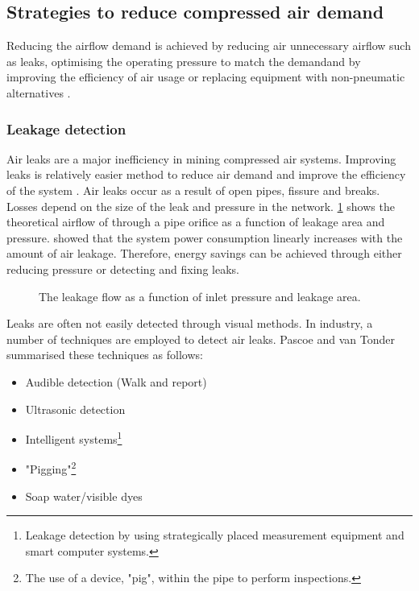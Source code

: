 	\subsection{Strategies to reduce compressed air demand}
	Reducing the airflow demand is achieved by reducing air unnecessary airflow such as leaks, optimising the operating pressure to match the demand\footnotemark[2] and by improving the efficiency of air usage or replacing equipment with non-pneumatic alternatives \cite{Snyman2011Masters}.
		 \subsubsection{Leakage detection}	 
		 Air leaks are a major inefficiency in mining compressed air systems. Improving leaks is relatively easier method to  reduce air demand and improve the efficiency of the system \cite{van2011sustaining}. Air leaks occur as a result of open pipes, fissure and breaks. Losses depend on the size of the leak and pressure in the network. \cref{fig: Leak losses} shows the theoretical airflow of through a pipe orifice as a function of leakage area and pressure\footnotemark[1]. \cite{van2011sustaining} showed that the system power consumption linearly increases with the amount of air leakage. Therefore, energy savings can be achieved through either reducing pressure or detecting and fixing leaks.
		 \begin{figure}[h]
		 	\centering
		 	\fbox{\hspace{2cm}\hspace{2cm}}
		 	\caption[The leakage flow as a function of inlet pressure and leakage area]{ The leakage flow as a function of inlet pressure and leakage area\protect\footnotemark[3].}
		 	\label{fig: Leak losses}
		 \end{figure}
	 \par 
		 Leaks are often not easily detected through visual methods. In industry, a number of techniques are employed to detect air leaks. Pascoe \cite{Pascoe2016Masters} and van Tonder \cite{vanTonder2010Masters} summarised these techniques as follows:
		 \begin{itemize}
		 	\item Audible detection (Walk and report)
		 	\item Ultrasonic detection
		 	\item Intelligent systems\footnote{Leakage detection by using strategically placed measurement equipment and smart computer systems.}
		 	\item "Pigging"\footnote{The use of a device, "pig", within the pipe to perform inspections.}
		 	\item Soap water/visible dyes 
		 \end{itemize}
